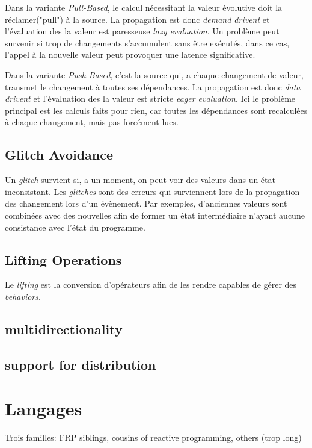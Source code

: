 \documentclass[10pt,final]{IEEEtran}
\begin{document}
Dans la variante \textit{Pull-Based}, le calcul nécessitant la valeur évolutive doit la réclamer("pull") à la source. La propagation est donc \textit{demand drivent} et l'évaluation des la valeur est paresseuse \textit{lazy evaluation}. Un problème peut survenir si trop de changements s'accumulent sans être exécutés, dans ce cas, l'appel à la nouvelle valeur peut provoquer une latence significative.

Dans la variante \textit{Push-Based}, c'est la source qui, a chaque changement de valeur, transmet le changement à toutes ses dépendances. La propagation est donc \textit{data drivent} et l'évaluation des la valeur est stricte \textit{eager evaluation}. Ici le problème principal est les calculs faits pour rien, car toutes les dépendances sont recalculées à chaque changement, mais pas forcément lues.

\subsection{Glitch Avoidance}
Un \textit{glitch} survient si, a un moment, on peut voir des valeurs dans un état inconsistant. Les \textit{glitches} sont des erreurs qui surviennent lors de la propagation des changement lors d'un évènement. Par exemples, d'anciennes valeurs sont combinées avec des nouvelles afin de former un état intermédiaire n'ayant aucune consistance avec l'état du programme.

\subsection{Lifting Operations}
Le \textit{lifting} est la conversion d'opérateurs afin de les rendre capables de gérer des \textit{behaviors}.

\subsection{multidirectionality}



\subsection{support for distribution}

\section{Langages}
Trois familles: FRP siblings, cousins of reactive programming, others (trop long)
\end{document}
